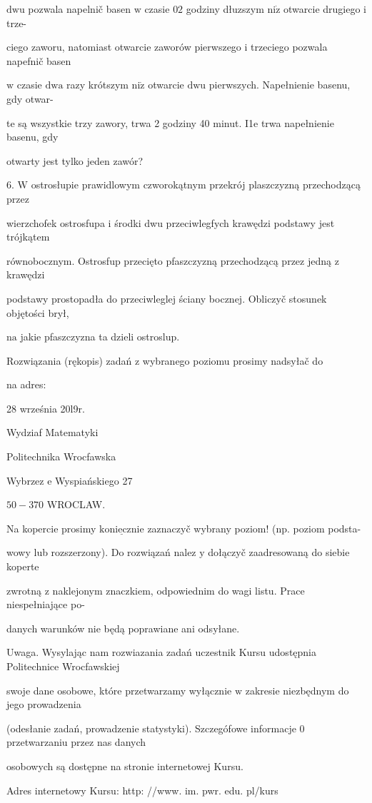 \documentclass[a4paper,12pt]{article}
\begin{document}
$\mathrm{d}\mathrm{w}\mathrm{u}$ pozwala napelnič basen $\mathrm{w}$ czasie $02$ godziny dłuzszym $\mathrm{n}\mathrm{i}\dot{\mathrm{z}}$ otwarcie drugiego $\mathrm{i}$ trze-

ciego zaworu, natomiast otwarcie zaworów pierwszego $\mathrm{i}$ trzeciego pozwala napefnič basen

$\mathrm{w}$ czasie $\mathrm{d}\mathrm{w}\mathrm{a}$ razy krótszym $\mathrm{n}\mathrm{i}\dot{\mathrm{z}}$ otwarcie $\mathrm{d}\mathrm{w}\mathrm{u}$ pierwszych. Napełnienie basenu, gdy otwar-

te są wszystkie trzy zawory, trwa 2 godziny 40 minut. I1e trwa napełnienie basenu, gdy

otwarty jest tylko jeden zawór?

6. $\mathrm{W}$ ostrosłupie prawidlowym czworokątnym przekrój plaszczyzną przechodzącą przez

wierzchofek ostrosfupa $\mathrm{i}$ środki dwu przeciwlegfych krawędzi podstawy jest trójkątem

równobocznym. Ostrosfup przecięto pfaszczyzną przechodzącą przez jedną $\mathrm{z}$ krawędzi

podstawy prostopadła do przeciwleglej ściany bocznej. Obliczyč stosunek objętości brył,

$\mathrm{n}\mathrm{a}$ jakie pfaszczyzna ta dzieli ostroslup.

Rozwiązania (rękopis) zadań z wybranego poziomu prosimy nadsyłač do

na adres:

28 września 20l9r.

Wydziaf Matematyki

Politechnika Wrocfawska

Wybrzez $\mathrm{e}$ Wyspiańskiego 27

$50-370$ WROCLAW.

Na kopercie prosimy $\underline{\mathrm{k}\mathrm{o}\mathrm{n}\mathrm{i}\mathrm{e}\mathrm{c}\mathrm{z}\mathrm{n}\mathrm{i}\mathrm{e}}$ zaznaczyč wybrany poziom! (np. poziom podsta-

wowy lub rozszerzony). Do rozwiązań nalez $\mathrm{y}$ dołączyč zaadresowaną do siebie koperte

zwrotną $\mathrm{z}$ naklejonym znaczkiem, odpowiednim do wagi listu. Prace niespełniające po-

danych warunków nie będą poprawiane ani odsyłane.

Uwaga. Wysylając nam rozwiazania zadań uczestnik Kursu udostępnia Politechnice Wrocfawskiej

swoje dane osobowe, które przetwarzamy wyłącznie $\mathrm{w}$ zakresie niezbędnym do jego prowadzenia

(odesłanie zadań, prowadzenie statystyki). Szczegófowe informacje $0$ przetwarzaniu przez nas danych

osobowych są dostępne na stronie internetowej Kursu.

Adres internetowy Kursu: http: //www. im. pwr. edu. pl/kurs
\end{document}
